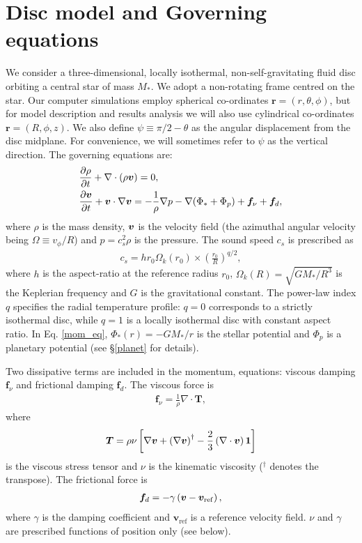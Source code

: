 \section{Disc model and Governing equations}\label{model} 
We consider a three-dimensional,  locally isothermal,
non-self-gravitating fluid disc orbiting a central 
star of mass $M_*$.  We adopt a non-rotating frame centred on the
  star. Our computer simulations employ spherical co-ordinates
  $\bm{r}=(r,\theta,\phi)$, but for model description and results 
  analysis we will also use cylindrical co-ordinates $\bm{r}=(R, \phi,
  z)$. We also define $\psi \equiv \pi/2 -
\theta$ as the angular displacement from the disc midplane. For
convenience, we will sometimes refer to $\psi$ as the vertical
direction. The governing equations are: 
\begin{align}
  &\frac{\partial\rho}{\partial t} + \nabla\cdot\left(\rho\bm{v}\right) =
  0,\label{cont_eq}\\ 
  &\frac{\partial\bm{v}}{\partial t} + \bm{v}\cdot\nabla\bm{v} = -\frac{1}{\rho}\nabla
  p -\nabla{\left(\Phi_*+\Phi_p\right)} +\bm{f}_\nu + \bm{f}_d\label{mom_eq},    
\end{align}
where $\rho$ is the mass density, $\bm{v}$ is the velocity field (the
azimuthal angular velocity being $\Omega\equiv v_\phi/R$) and 
$p=c_s^2\rho$ is the pressure. 
The sound speed $c_s$ is prescribed as 
\begin{align}
  c_s = hr_0\Omega_k(r_0)\times\left(\frac{r_0}{R}\right)^{q/2}, 
\end{align}
where $h$ is the aspect-ratio at the reference radius $r_0$, 
$\Omega_k(R) = \sqrt{GM_*/R^3}$ is the Keplerian frequency and $G$ is
the gravitational constant. The power-law index $q$ specifies the
radial temperature profile: $q=0$ corresponds to a strictly isothermal
disc, while $q=1$ is a locally isothermal disc with constant aspect
ratio. In Eq. \ref{mom_eq}, $\Phi_*(r) = -GM_*/r $ is the stellar
potential and $\Phi_p$ is a planetary potential (see \S\ref{planet}
for details).  

Two dissipative terms are included in the momentum, equations: viscous
damping $\bm{f}_\nu$ and frictional damping $\bm{f}_d$. The viscous
force is 
\begin{align}
  \bm{f}_\nu = \frac{1}{\rho}\nabla\cdot\bm{T},
\end{align}
where 
\begin{align}
  \bm{T} = \rho\nu \left[\nabla\bm{v} + \left(\nabla\bm{v}\right)^\dagger
    - \frac{2}{3}\left(\nabla\cdot\bm{v}\right)\bm{1} \right]
\end{align}
is the viscous stress tensor and $\nu$ is the kinematic viscosity 
($^\dagger$ denotes the transpose). The frictional force is 
\begin{align}
  \bm{f}_d = -\gamma\left(\bm{v} - \bm{v}_\mathrm{ref}\right),
\end{align}
where $\gamma$ is the damping coefficient and
$\bm{v}_\mathrm{ref}$ is a reference velocity field. 
$\nu$ and $\gamma$ are prescribed functions of position only (see
below). %


